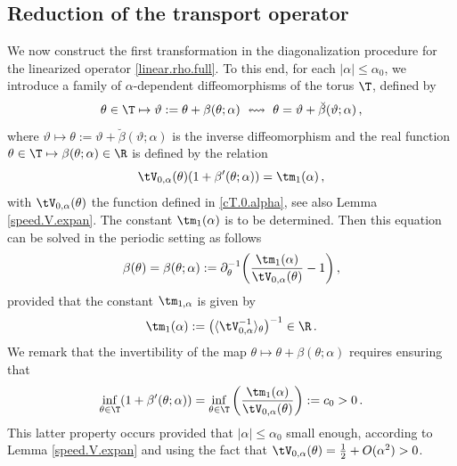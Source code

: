 \documentclass[a4paper,reqno,10pt]{article}
\newcommand{\pa}{\partial}
\begin{document}
\subsection{Reduction of the transport operator}\label{Redu-transpo}
We now construct the first transformation in the diagonalization procedure for the linearized operator \eqref{linear.rho.full}.  
To this end, for each $|\alpha|\leq \alpha_{0}$, we introduce a family of $\alpha$-dependent diffeomorphisms of the torus $\T$, defined by
\begin{equation}
	 \theta\in \T \mapsto \vartheta := \theta + \beta(\theta;\alpha) \ \leftrightsquigarrow \ \theta = \vartheta + \breve{\beta}(\vartheta;\alpha)\,,
\end{equation}
where $\vartheta\mapsto  \theta:=\vartheta+\breve{\beta}(\vartheta;\alpha)$ is the inverse diffeomorphism and the real function $\theta\in\T\mapsto \beta(\theta;\alpha)\in\R$ is defined by the relation
\begin{equation*}
	\tV_{0,\alpha}(\theta)(1+ \beta'(\theta;\alpha)) = \tm_{1}(\alpha)\,,
\end{equation*}
with $\tV_{0,\alpha}(\theta)$ the function defined in \eqref{cT.0.alpha}, see also Lemma \ref{speed.V.expan}. The constant $\tm_{1}(\alpha)$ is to be determined. 
Then this equation can be solved  in the periodic setting as follows
\begin{equation}\label{defn.beta}
	 \beta(\theta)= \beta(\theta;\alpha) := \pa_{\theta}^{-1} \bigg(  \frac{\tm_{1}(\alpha)}{\tV_{0,\alpha}(\theta)}- 1 \bigg)\,,
\end{equation}
 provided that the constant $\tm_{1,\alpha}$ is given by
\begin{equation}\label{m1.alpha}
	\tm_{1}(\alpha):=\big( \langle 
	\tV_{0,\alpha}^{-1} \rangle_{\theta}\big)^{-1} \in \R\,. 
\end{equation}
We remark that the invertibility of the map
$\theta \mapsto \theta + \beta(\theta;\alpha)$
requires ensuring that
\begin{equation}
	\inf_{\theta \in \T} (1 + \beta'(\theta;\alpha)) = \inf_{\theta\in\T}\bigg(  \frac{\tm_{1}(\alpha)}{\tV_{0,\alpha}(\theta)} \bigg) := c_0 > 0\,.
\end{equation}
This latter property occurs provided that  $|\alpha|\leq \alpha_{0} $ small enough, according to  Lemma \ref{speed.V.expan} and using the fact that $ \tV_{0,\alpha}(\theta) = \tfrac12 + O(\alpha^2) >0$.
\end{document}
